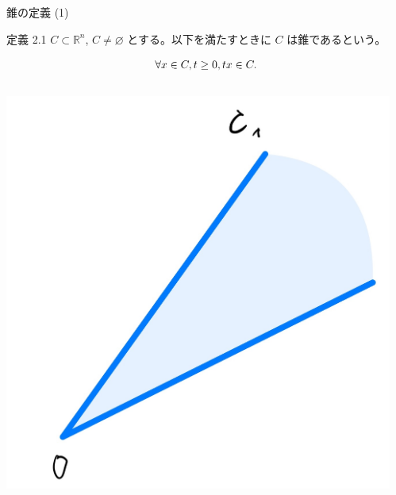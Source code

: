 \documentclass[aspectratio=169, dvipdfmx, 11pt]{beamer} %
\begin{document}
\begin{frame}{錐の定義 (1) }
  \begin{block}{定義 2.1}
    $C \subset \mathbb{R}^n$, $C \neq \varnothing$ とする。以下を満たすときに $C$ は錐であるという。

    \begin{equation}
      \forall x \in C, t \geq 0, tx \in C. \notag
    \end{equation}

  \end{block}
  \centering
  \begin{columns}
    \begin{column}{0.31\textwidth}
      \includegraphics[keepaspectratio, scale=0.08]{figures/cone_figure_1.jpg}
    \end{column}
    \begin{column}{0.31\textwidth}

\end{column}
\end{columns}
\end{frame}
\end{document}
